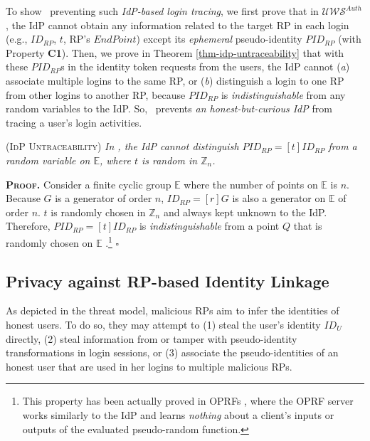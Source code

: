 To show \usso\ preventing such \emph{IdP-based login tracing}, we first prove that in $\mathcal{UWS}^{Auth}$, the IdP cannot obtain any information related to the target RP in each login (e.g., $ID_{RP}$, $t$, RP's $EndPoint$) except its \emph{ephemeral} pseudo-identity $PID_{RP}$ (with Property {\bf C1}). Then, we prove in Theorem \ref{thm-idp-untraceability} that with these $PID_{RP}$s in the identity token requests from the users, the IdP cannot (\emph{a}) associate multiple logins to the same RP, or (\emph{b}) distinguish a login to one RP from other logins to another RP, because $PID_{RP}$ is \emph{indistinguishable} from any random variables to the IdP. So, \usso\ prevents \emph{an honest-but-curious IdP} from tracing a user's login activities.

\begin{thm}
\textsc{(IdP Untraceability)} \emph{In \usso, the IdP cannot distinguish $PID_{RP} = [t]ID_{RP}$ from a random variable on $\mathbb{E}$, where $t$ is random in $\mathbb{Z}_n$.}
\label{thm-idp-untraceability}
\end{thm}

\noindent\textbf{\textsc{Proof.}}
Consider a finite cyclic group $\mathbb{E}$ where the number of points on $\mathbb{E}$ is $n$.
Because $G$ is a generator of order $n$, $ID_{RP} = [r]G$ is also a generator on $\mathbb{E}$ of order $n$. %
$t$ is randomly chosen in $\mathbb{Z}_n$ and always kept unknown to the IdP. Therefore, $PID_{RP} = [t]ID_{RP}$ is \emph{indistinguishable} from a point $Q$ that is randomly chosen on $\mathbb{E}$ \cite{oprf-proved,voprf-proved}.\footnote{\newc This property has been actually proved in OPRFs \cite{oprf-proved,voprf-proved}, where the OPRF server works similarly to the IdP and learns \emph{nothing} about a client's inputs or outputs of the evaluated pseudo-random function.} \hfill $\square$

\subsection{Privacy against RP-based Identity Linkage}
\label{subsec:RP-privacy}

As depicted in the threat model, malicious RPs aim to infer the identities of honest users. To do so, they may attempt to (1) steal the user's identity $ID_U$ directly, (2) steal information from or tamper with pseudo-identity transformations in login sessions, or (3) associate the pseudo-identities of an honest user that are used in her logins to multiple malicious RPs. 

